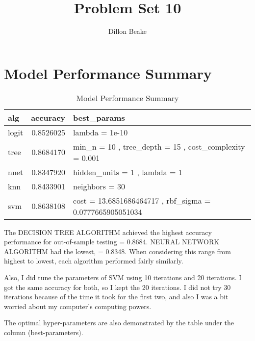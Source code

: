 \documentclass{article}
\title{Problem Set 10}
\author{Dillon Beake}
\begin{document}
\maketitle


\section{Model Performance Summary}
\begin{table}[!htb]
\caption{\label{tab:tab:model_summary}Model Performance Summary}
\centering
\begin{tabular}[t]{lrl}
\toprule
alg & accuracy & best\_params\\
\midrule
logit & 0.8526025 & lambda = 1e-10\\
tree & 0.8684170 & min\_n = 10 , tree\_depth = 15 , cost\_complexity = 0.001\\
nnet & 0.8347920 & hidden\_units = 1 , lambda = 1\\
knn & 0.8433901 & neighbors = 30\\
svm & 0.8638108 & cost = 13.6851686464717 , rbf\_sigma = 0.0777665905051034\\
\bottomrule
\end{tabular}
\end{table}

The DECISION TREE ALGORITHM achieved the highest accuracy performance for out-of-sample testing = 0.8684. NEURAL NETWORK ALGORITHM had the lowest, = 0.8348. When considering this range from highest to lowest, each algorithm performed fairly similarly.

Also, I did tune the parameters of SVM using 10 iterations and 20 iterations. I got the same accuracy for both, so I kept the 20 iterations. I did not try 30 iterations because of the time it took for the first two, and also I was a bit worried about my computer's computing powers.

The optimal hyper-parameters are also demonstrated by the table under the column (best-parameters).
\end{document}
